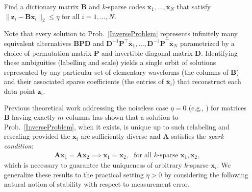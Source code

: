\begin{problem}\label{InverseProblem}
Find a dictionary matrix $\mathbf{B}$ and $k$-sparse codes $\mathbf{\overline x}_1, \ldots, \mathbf{\overline x}_N$ that satisfy $\|\mathbf{z}_i - \mathbf{B}\mathbf{\overline x}_i\|_2 \leq \eta$ for all $i = 1,\ldots,N$.
\end{problem}

Note that every solution to Prob.~\ref{InverseProblem} represents infinitely many equivalent alternatives $\mathbf{BPD}$ and $\mathbf{D}^{-1}\mathbf{P}^{\top}\mathbf{\overline x}_1, \ldots, \mathbf{D}^{-1}\mathbf{P}^{\top}\mathbf{\overline x}_N$ parametrized by a choice of permutation matrix $\mathbf{P}$ and invertible diagonal matrix $\mathbf{D}$. 
Identifying these ambiguities (labelling and scale) yields a single orbit of solutions represented by any particular set of elementary waveforms (the columns of $\mathbf{B}$) and their associated sparse coefficients (the entries of $\mathbf{\overline x}_i$) that reconstruct each data point $\mathbf{z}_i$. 

Previous theoretical work addressing the noiseless case $\eta =0$ (e.g., \cite{li2004analysis, Georgiev05, Aharon06, Hillar15}) for matrices $\mathbf{B}$ having exactly $m$ columns has shown that a solution to Prob.~\ref{InverseProblem}, when it exists, is unique up to such relabeling and rescaling provided the $\mathbf{x}_i$ are sufficiently diverse and $\mathbf{A}$ satisfies the \textit{spark condition}:
\begin{align}\label{SparkCondition}
\mathbf{A}\mathbf{x}_1 = \mathbf{A}\mathbf{x}_2 \implies \mathbf{x}_1 = \mathbf{x}_2, \ \ \ \text{for all $k$-sparse } \mathbf{x}_1, \mathbf{x}_2,
\end{align}
%
which is necessary to guarantee the uniqueness of arbitrary $k$-sparse $\mathbf{x}_i$. We generalize these results to the practical setting  $\eta > 0$ by considering the following natural notion of stability with respect to measurement error.


